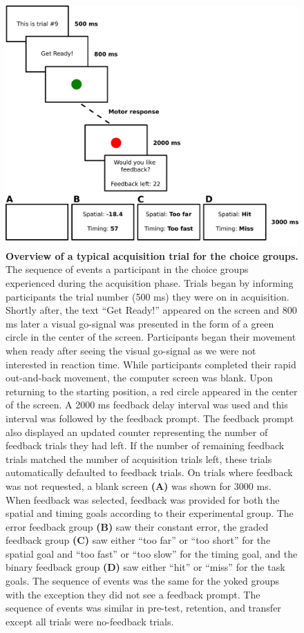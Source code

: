 \documentclass[
  doc, donotrepeattitle,floatsintext]{apa7}
\begin{document}
\begin{figure}

{\centering \includegraphics[height=0.45\textheight]{../../figs/fig1} 

}

\caption{\small \onehalfspacing \textbf{Overview of a typical acquisition trial for the choice groups.} The sequence of events a participant in the choice groups experienced during the acquisition phase. Trials began by informing participants the trial number (500 ms) they were on in acquisition. Shortly after, the text ``Get Ready!'' appeared on the screen and 800 ms later a visual go-signal was presented in the form of a green circle in the center of the screen. Participants began their movement when ready after seeing the visual go-signal as we were not interested in reaction time. While participants completed their rapid out-and-back movement, the computer screen was blank. Upon returning to the starting position, a red circle appeared in the center of the screen. A 2000 ms feedback delay interval was used and this interval was followed by the feedback prompt. The feedback prompt also displayed an updated counter representing the number of feedback trials they had left. If the number of remaining feedback trials matched the number of acquisition trials left, these trials automatically defaulted to feedback trials. On trials where feedback was not requested, a blank screen \textbf{(A)} was shown for 3000 ms. When feedback was selected, feedback was provided for both the spatial and timing goals according to their experimental group. The error feedback group \textbf{(B)} saw their constant error, the graded feedback group \textbf{(C)} saw either ``too far'' or ``too short'' for the spatial goal and ``too fast'' or ``too slow'' for the timing goal, and the binary feedback group \textbf{(D)} saw either ``hit'' or ``miss'' for the task goals. The sequence of events was the same for the yoked groups with the exception they did not see a feedback prompt. The sequence of events was similar in pre-test, retention, and transfer except all trials were no-feedback trials.}\label{fig:fig1}
\end{figure}
\end{document}
